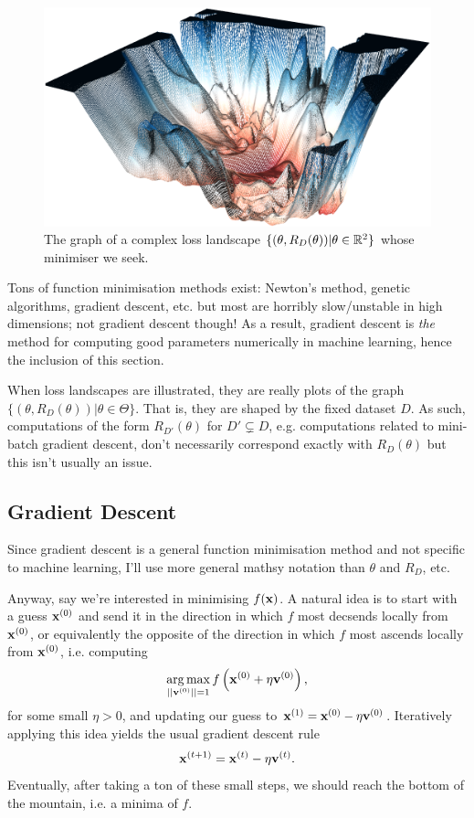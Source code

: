 \documentclass[11pt]{article}
\begin{document}
\begin{figure}[t]
    \centering
    \includegraphics[width=0.75\columnwidth]{./figures/gradient_descent/loss_landscape.png}
    \caption{The graph of a complex loss landscape $\{(\theta,R_D(\theta))|\theta\in\mathbb{R}^2\}$ whose minimiser we seek. }
    \label{fig:loss_landscape_complex}
\end{figure}

Tons of function minimisation methods exist: Newton's method, genetic algorithms, gradient descent, etc. but most are horribly slow/unstable in high dimensions; not gradient descent though! As a result, gradient descent is \textit{the} method for computing good parameters numerically in machine learning, hence the inclusion of this section.

\begin{tcolorbox}[title={\centering\centering\textbf{Loss landscapes are dataset-dependent!}}, colback=myLightBlue, colbacktitle=myDarkBlue, colframe=myDarkBlue, coltitle=white]
    When loss landscapes are illustrated, they are really plots of the graph $\{(\theta, R_D(\theta))|\theta\in\Theta\}$. That is, they are shaped by the fixed dataset $D$. As such, computations of the form $R_{D'}(\theta)$ for $D'\subsetneq D$, e.g. computations related to mini-batch gradient descent, don't necessarily correspond exactly with $R_D(\theta)$ but this isn't usually an issue.
\end{tcolorbox}

\subsection{Gradient Descent}
Since gradient descent is a general function minimisation method and not specific to machine learning, I'll use more general mathsy notation than $\theta$ and $R_D$, etc.

Anyway, say we're interested in minimising $f(\mathbf{x})$. A natural idea is to start with a guess $\mathbf{x}^{(0)}$ and send it in the direction in which $f$ most decsends locally from $\mathbf{x}^{(0)}$, or equivalently the opposite of the direction in which $f$ most ascends locally from $\mathbf{x}^{(0)}$, i.e. computing
$$
\operatorname*{arg\,max}_{||\mathbf{v}^{(0)}||=1}f\left(\mathbf{x}^{(0)}+\eta\mathbf{v}^{(0)}\right),
$$
for some small $\eta>0$, and updating our guess to $\mathbf{x}^{(1)}=\mathbf{x}^{(0)}-\eta\mathbf{v}^{(0)}$. Iteratively applying this idea yields the usual gradient descent rule
$$
\mathbf{x}^{(t+1)}
=
\mathbf{x}^{(t)}-\eta\mathbf{v}^{(t)}.
$$
Eventually, after taking a ton of these small steps, we should reach the bottom of the mountain, i.e. a minima of $f$.
\end{document}
